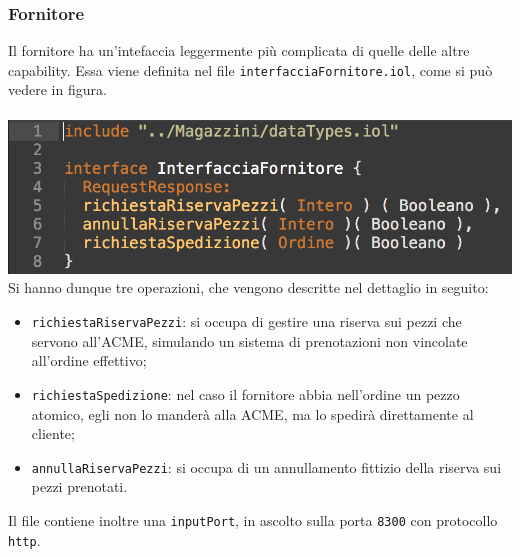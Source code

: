 \subsubsection*{Fornitore}
Il fornitore ha un'intefaccia leggermente pi\`u complicata di quelle
delle altre capability. Essa viene definita nel file
{\tt interfacciaFornitore.iol}, come si pu\`o vedere in figura. \\\\
\includegraphics[scale=0.5]{immagini/interfFornitore.png}\\
Si hanno dunque tre operazioni, che vengono descritte nel dettaglio in
seguito:
\begin{itemize}
  \item {\tt richiestaRiservaPezzi}: si occupa di gestire una riserva
  sui pezzi che servono all'ACME, simulando un sistema di prenotazioni
  non vincolate all'ordine effettivo;
  \item {\tt richiestaSpedizione}: nel caso il fornitore abbia
  nell'ordine un pezzo atomico, egli non lo mander\`a alla ACME, ma lo
  spedir\`a direttamente al cliente;
  \item {\tt annullaRiservaPezzi}: si occupa di un annullamento fittizio
  della riserva sui pezzi prenotati.
\end{itemize}
Il file contiene inoltre una {\tt inputPort}, in ascolto sulla porta
{\tt 8300} con protocollo {\tt http}.
